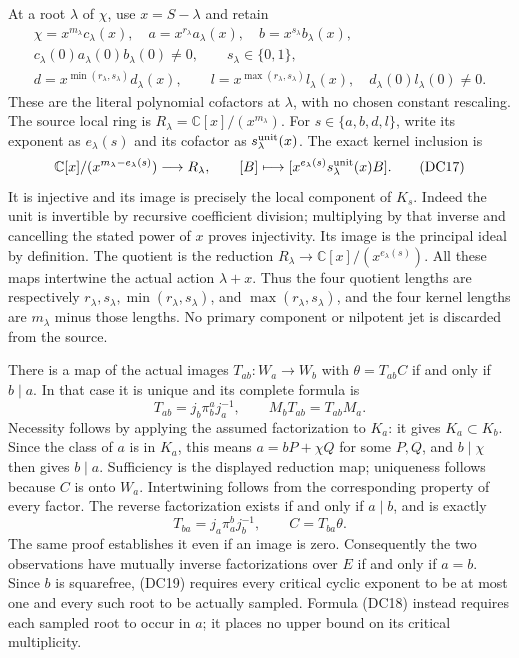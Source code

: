 At a root $\lambda$ of $\chi$, use $x=S-\lambda$ and retain
\[
 \begin{gathered}
 \chi=x^{m_\lambda}c_\lambda(x),\quad
 a=x^{r_\lambda}a_\lambda(x),\quad
 b=x^{s_\lambda}b_\lambda(x),\\
 c_\lambda(0)a_\lambda(0)b_\lambda(0)\ne0,\qquad
 s_\lambda\in\{0,1\},\\
 d=x^{\min(r_\lambda,s_\lambda)}d_\lambda(x),\qquad
 l=x^{\max(r_\lambda,s_\lambda)}l_\lambda(x),
 \quad d_\lambda(0)l_\lambda(0)\ne0 .
 \end{gathered}
 \tag{DC16}
\]
These are the literal polynomial cofactors at $\lambda$, with no
chosen constant rescaling.  The source local ring is
$R_\lambda=\mathbb C[x]/(x^{m_\lambda})$.  For
$s\in\{a,b,d,l\}$, write its exponent as $e_\lambda(s)$ and its
cofactor as $s_\lambda^{\rm unit}(x)$.  The exact kernel inclusion is
\[
 \mathbb C[x]/(x^{m_\lambda-e_\lambda(s)})
 \longrightarrow R_\lambda,\qquad
 [B]\longmapsto
 [x^{e_\lambda(s)}s_\lambda^{\rm unit}(x)B].
 \tag{DC17}
\]
It is injective and its image is precisely the local component of
$K_s$.  Indeed the unit is invertible by recursive coefficient
division; multiplying by that inverse and cancelling the stated
power of $x$ proves injectivity.  Its image is the principal ideal
by definition.  The quotient is the reduction
$R_\lambda\to\mathbb C[x]/(x^{e_\lambda(s)})$.
All these maps intertwine the actual action $\lambda+x$.
Thus the four quotient lengths are respectively
$r_\lambda,s_\lambda,\min(r_\lambda,s_\lambda)$, and
$\max(r_\lambda,s_\lambda)$, and the four kernel lengths are
$m_\lambda$ minus those lengths.  No primary component or nilpotent
jet is discarded from the source.

There is a map of the actual images $T_{ab}:W_a\to W_b$ with
$\theta=T_{ab}C$ if and only if $b\mid a$.  In that case it is
unique and its complete formula is
\[
 T_{ab}=j_b\pi_b^a j_a^{-1},\qquad
 M_bT_{ab}=T_{ab}M_a .
 \tag{DC18}
\]
Necessity follows by applying the assumed factorization to
$K_a$: it gives $K_a\subset K_b$.  Since the class of $a$ is in
$K_a$, this means $a=bP+\chi Q$ for some $P,Q$, and $b\mid\chi$
then gives $b\mid a$.  Sufficiency is the displayed reduction map;
uniqueness follows because $C$ is onto $W_a$.  Intertwining follows
from the corresponding property of every factor.  The reverse
factorization exists if and only if $a\mid b$, and is exactly
\[
 T_{ba}=j_a\pi_a^b j_b^{-1},\qquad C=T_{ba}\theta .
 \tag{DC19}
\]
The same proof establishes it even if an image is zero.
Consequently the two observations have mutually inverse
factorizations over $E$ if and only if $a=b$.  Since $b$ is
squarefree, (DC19) requires every critical cyclic exponent to be at
most one and every such root to be actually sampled.  Formula
(DC18) instead requires each sampled root to occur in $a$; it
places no upper bound on its critical multiplicity.

